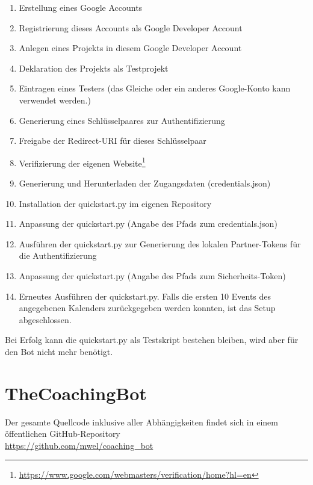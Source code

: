             \begin{enumerate}
                \item Erstellung eines Google Accounts
                \item Registrierung dieses Accounts als Google Developer Account
                \item Anlegen eines Projekts in diesem Google Developer Account
                \item Deklaration des Projekts als Testprojekt
                \item Eintragen eines Testers (das Gleiche oder ein anderes Google-Konto kann verwendet werden.)
                \item Generierung eines Schlüsselpaares zur Authentifizierung
                \item Freigabe der Redirect-URI für dieses Schlüsselpaar
                \item Verifizierung der eigenen Website\footnote{\url{https://www.google.com/webmasters/verification/home?hl=en}}
                \item Generierung und Herunterladen der Zugangsdaten (credentials.json)
                \item Installation der quickstart.py im eigenen Repository
                \item Anpassung der quickstart.py (Angabe des Pfads zum credentials.json)
                \item Ausführen der quickstart.py zur Generierung des lokalen Partner-Tokens für die Authentifizierung
                \item Anpassung der quickstart.py (Angabe des Pfads zum Sicherheits-Token)
                \item Erneutes Ausführen der quickstart.py. Falls die ersten 10 Events des angegebenen Kalenders zurückgegeben werden konnten, ist das Setup abgeschlossen.                    
            \end{enumerate}
        
            Bei Erfolg kann die quickstart.py als Testskript bestehen bleiben, wird aber für den Bot nicht mehr benötigt.
        
    \section{TheCoachingBot}
        Der gesamte Quellcode inklusive aller Abhängigkeiten findet sich in einem öffentlichen GitHub-Repository\\
        \url{https://github.com/mwel/coaching_bot}
        

